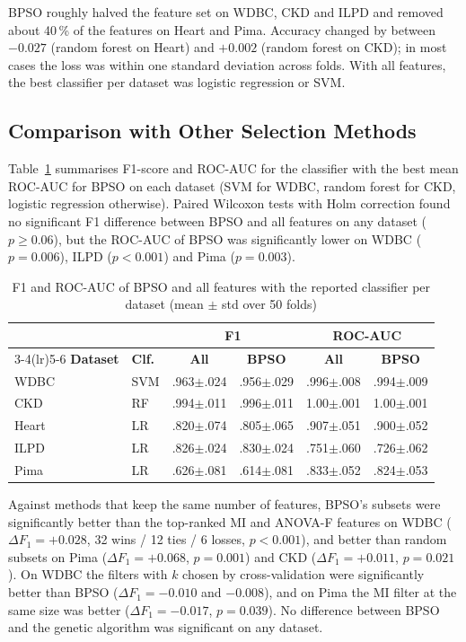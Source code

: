 \documentclass[conference]{IEEEtran}
\begin{document}
BPSO roughly halved the feature set on WDBC, CKD and ILPD and removed about
40\,\% of the features on Heart and Pima. Accuracy changed by between
$-0.027$ (random forest on Heart) and $+0.002$ (random forest on CKD); in most
cases the loss was within one standard deviation across folds. With all
features, the best classifier per dataset was logistic regression or SVM.

\subsection{Comparison with Other Selection Methods}

Table~\ref{tab:main} summarises F1-score and ROC-AUC for the classifier with
the best mean ROC-AUC for BPSO on each dataset (SVM for WDBC, random forest
for CKD, logistic regression otherwise). Paired Wilcoxon tests with Holm
correction found no significant F1 difference between BPSO and all features on
any dataset ($p \geq 0.06$), but the ROC-AUC of BPSO was significantly lower on
WDBC ($p = 0.006$), ILPD ($p < 0.001$) and Pima ($p = 0.003$).

\begin{table}[!t]
\centering
\caption{F1 and ROC-AUC of BPSO and all features with the reported
classifier per dataset (mean $\pm$ std over 50 folds)}
\label{tab:main}
\footnotesize
\setlength{\tabcolsep}{2.5pt}
\begin{tabular}{llcccc}
\toprule
 & & \multicolumn{2}{c}{\textbf{F1}} & \multicolumn{2}{c}{\textbf{ROC-AUC}} \\
\cmidrule(lr){3-4}\cmidrule(lr){5-6}
\textbf{Dataset} & \textbf{Clf.} & \textbf{All} & \textbf{BPSO} & \textbf{All} & \textbf{BPSO} \\
\midrule
WDBC  & SVM & .963$\pm$.024 & .956$\pm$.029 & .996$\pm$.008 & .994$\pm$.009 \\
CKD   & RF  & .994$\pm$.011 & .996$\pm$.011 & 1.00$\pm$.001 & 1.00$\pm$.001 \\
Heart & LR  & .820$\pm$.074 & .805$\pm$.065 & .907$\pm$.051 & .900$\pm$.052 \\
ILPD  & LR  & .826$\pm$.024 & .830$\pm$.024 & .751$\pm$.060 & .726$\pm$.062 \\
Pima  & LR  & .626$\pm$.081 & .614$\pm$.081 & .833$\pm$.052 & .824$\pm$.053 \\
\bottomrule
\end{tabular}
\end{table}

Against methods that keep the same number of features, BPSO's subsets were
significantly better than the top-ranked MI and ANOVA-F features on WDBC
($\Delta F_1 = +0.028$, 32 wins / 12 ties / 6 losses, $p < 0.001$), and better
than random subsets on Pima ($\Delta F_1 = +0.068$, $p = 0.001$) and CKD
($\Delta F_1 = +0.011$, $p = 0.021$). On WDBC the filters with $k$ chosen by
cross-validation were significantly better than BPSO ($\Delta F_1 = -0.010$
and $-0.008$), and on Pima the MI filter at the same size was better
($\Delta F_1 = -0.017$, $p = 0.039$). No difference between BPSO and the
genetic algorithm was significant on any dataset.
\end{document}
